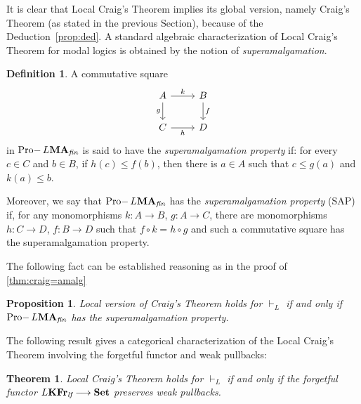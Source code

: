 \documentclass{article}
\newtheorem{thm}{Theorem}
\newtheorem{prop}{Proposition}
\theoremstyle{definition}
\newtheorem{defn}{Definition}
\DeclareMathOperator{\Pro}{Pro-}
\newcommand{\KFr}{\textup{\textbf{KFr}}}
\newcommand{\MA}{\textup{\textbf{MA}}}
\newcommand{\fin}{\textit{fin}}
\newcommand{\lf}{\textit{lf}}
\newcommand{\Set}{\textup{\textbf{Set}}}
\begin{document}
It is clear that Local Craig's Theorem implies its global version, namely Craig's Theorem (as stated in the previous Section), because of the Deduction~\cref{prop:ded}. A standard algebraic characterization of Local Craig's Theorem for modal logics is obtained by the notion of \emph{superamalgamation}.

\begin{defn}
A commutative square
\[\begin{tikzcd}
	A & B \\
	C & D
	\arrow["k", from=1-1, to=1-2]
	\arrow["g"', from=1-1, to=2-1]
	\arrow["f", from=1-2, to=2-2]
	\arrow["h"', from=2-1, to=2-2]
\end{tikzcd}\]
in $\Pro L\MA_\fin$ is said to have the \emph{superamalgamation property} if: for every $c \in C$ and $b \in B$, if $h(c) \leq f(b)$, then there is $a \in A$ such that $c \leq g(a)$ and $k(a) \leq b$.

Moreover, we
say that $\Pro L\MA_\fin$ has the \emph{superamalgamation property} (SAP) if, for any monomorphisms $k \colon A \longrightarrow B$, $g \colon A \longrightarrow C$, there are monomorphisms $h \colon C \longrightarrow D$, $f \colon B \longrightarrow D$ such that $f \circ k = h \circ g$
and such a commutative square has the superamalgamation property.
\end{defn}

The following fact can be established reasoning as in the proof of \cref{thm:craig=amalg}

\begin{prop}
Local version of Craig's Theorem holds for $\vdash_L$ if and only if $\Pro L\MA_\fin$ has the superamalgamation property.
\end{prop}

The following result gives a categorical characterization of the Local Craig's Theorem involving the forgetful functor and weak pullbacks:

\begin{thm}\label{thm:craig}
Local Craig's Theorem holds for $\vdash_L$ if and only if the forgetful functor $L\KFr_\lf \longrightarrow \Set$ preserves weak pullbacks.
\end{thm}
\end{document}
